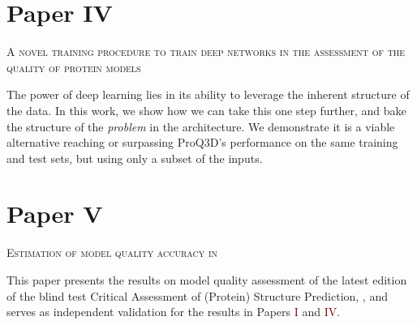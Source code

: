 \section*{Paper \textcolor[cmyk]{0, 0.87, 0.68, 0.32}{IV}}
\begin{center}
	\textsc{A novel training procedure to train deep networks in the assessment of the quality of protein models}
\end{center}

\noindent
The power of deep learning lies in its ability to leverage the inherent structure of the data.
In this work, we show how we can take this one step further, and bake the structure of the \emph{problem} in the architecture.
We demonstrate it is a viable alternative reaching or surpassing ProQ3D's performance on the same training and test sets, but using only a subset of the inputs.

\section*{Paper \textcolor[cmyk]{0, 0.87, 0.68, 0.32}{V}}
\begin{center}
	\textsc{Estimation of model quality accuracy in }
\end{center}

\noindent
This paper presents the results on model quality assessment of the latest edition of the blind test Critical Assessment of (Protein) Structure Prediction, ,
and serves as independent validation for the results in Papers \textcolor{Maroon}{I} and \textcolor{Maroon}{IV}.
